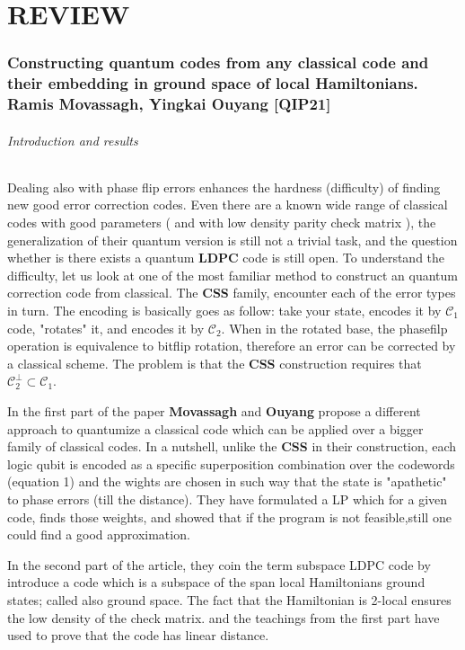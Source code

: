 \documentclass{article}
\begin{document}
\part{REVIEW} 

\section*{Constructing quantum codes from any classical code and
their embedding in ground space of local Hamiltonians. Ramis Movassagh, Yingkai Ouyang [QIP21] }
\paragraph{Introduction and results} Dealing also with phase flip errors enhances the hardness (difficulty) of finding new good error correction codes. Even there are a known wide range of classical codes with good parameters ( and with low density parity check matrix ), the generalization of their quantum version is still not a trivial task, and the question whether is there exists a quantum \textbf{LDPC} code is still open. To understand the difficulty, let us look at one of the most familiar method to construct an quantum correction code from classical. The \textbf{CSS} family, encounter each of the error types in turn. The encoding is basically goes as follow: take your state, encodes it by \( \mathcal{C}_1 \) code,  "rotates" it, and encodes it by \( \mathcal{C}_2 \). When in the rotated base, the phasefilp operation is equivalence to bitflip rotation, therefore an error can be corrected by a classical scheme. 
The problem is that the \textbf{CSS} construction requires that  \( \mathcal{C}_{2}^{\perp} \subset \mathcal{C}_{1}\). 

In the first part of the paper \textbf{Movassagh} and \textbf{Ouyang} propose a different approach to quantumize a classical code which can be applied over a bigger family of classical codes. In a nutshell, unlike the \textbf{CSS} in their construction, each logic qubit is encoded as a specific superposition combination over the codewords (equation 1) and the wights are chosen in such way that the state is "apathetic" to phase errors (till the distance). They have formulated a LP which for a given code, finds those weights, and showed that if the program is not feasible,still one could find a good approximation.  

In the second part of the article, they coin the term subspace LDPC code by  introduce a code which is a subspace of the span local Hamiltonians ground states; called also ground space. The fact that the Hamiltonian is 2-local ensures the low density of the check matrix. and the teachings from the first part have used to prove that the code has linear distance. 
\end{document}
